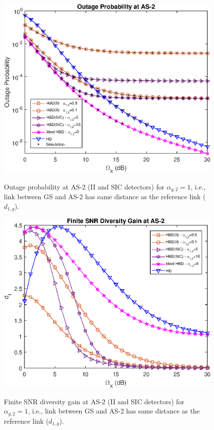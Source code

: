 \begin{figure}[]
\vspace{-0.5cm}
\centering
\includegraphics [width=0.6\columnwidth]{chap4_fig/fixed_pout_as2.eps}
\label{fig:fixed_pout_as2}
\caption{Outage probability at AS-2 (II and SIC detectors) for $\alpha_{g,2}=1$, i.e., link between GS and AS-2 has same distance as the reference link ($d_{1,g}$).}
\vspace{-1cm}
\end{figure}

\begin{figure}[]
\vspace{-0.5cm}
\centering
\includegraphics [width=0.6\columnwidth]{chap4_fig/fixed_df_as2.eps}
\label{fig:fixed_df_as2}
\caption{Finite SNR diversity gain at AS-2 (II and SIC detectors) for $\alpha_{g,2}=1$, i.e., link between GS and AS-2 has same distance as the reference link ($d_{1,g}$).}
\vspace{-1cm}
\end{figure}

